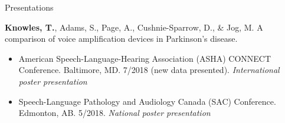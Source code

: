 \documentclass{resume} %
\begin{document}
\begin{rSection}{Presentations}
\begin{etaremune}
\item {\bf Knowles, T.}, Adams, S., Page, A., Cushnie-Sparrow, D., \& Jog, M. A comparison of voice amplification devices in Parkinson's disease. 
		\begin{itemize}
			\renewcommand\labelitemi{$\cdot$}
			\item American Speech-Language-Hearing Association (ASHA) CONNECT Conference. Baltimore, MD. 7/2018 (new data presented). \emph{International poster presentation}
			\item Speech-Language Pathology and Audiology Canada (SAC) Conference. Edmonton, AB. 5/2018. \emph{National poster presentation}
		\end{itemize}
	

	
	
%	
%	
	

\end{etaremune}
\end{rSection}
\end{document}

